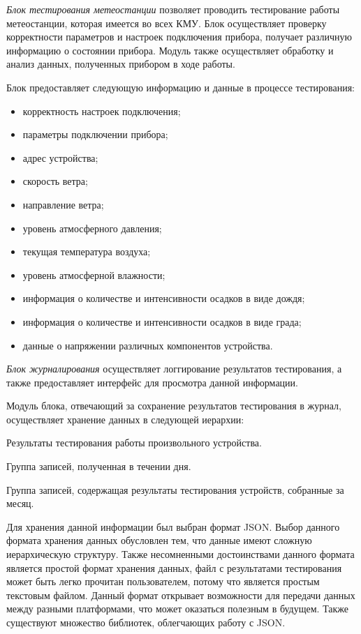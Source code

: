 \textit{Блок тестирования метеостанции} позволяет проводить тестирование работы метеостанции, которая имеется во
всех КМУ.
Блок осуществляет проверку корректности параметров и настроек подключения прибора, получает различную
информацию о
состоянии прибора. Модуль также осуществляет обработку и анализ данных, полученных прибором в ходе работы.

Блок предоставляет следующую информацию и данные в процессе тестирования:
\begin{itemize}
		\item корректность настроек подключения;
		\item параметры подключении прибора;
		\item адрес устройства;
		\item скорость ветра;
		\item направление ветра;
		\item уровень атмосферного давления;
		\item текущая температура воздуха;
		\item уровень атмосферной влажности;
		\item информация о количестве и интенсивности осадков в виде дождя;
		\item информация о количестве и интенсивности осадков в виде града;
		\item данные о напряжении различных компонентов устройства.
\end{itemize}

\textit{Блок журналирования} осуществляет логгирование результатов тестирования, а также предоставляет интерфейс для
просмотра данной информации.

Модуль блока, отвечающий за сохранение результатов тестирования в журнал, осуществляет хранение данных в следующей
иерархии:
\begin{enum}
	\item Результаты тестирования работы произвольного устройства.
	\item Группа записей, полученная в течении дня.
	\item Группа записей, содержащая результаты тестирования устройств, собранные за месяц.
\end{enum}

Для хранения данной информации был выбран формат JSON. Выбор данного формата хранения данных обусловлен тем, что данные
имеют сложную иерархическую структуру. Также несомненными достоинствами данного формата является простой формат
хранения данных, файл с результатами тестирования может быть легко прочитан пользователем, потому что является простым
текстовым файлом. Данный формат открывает возможности для передачи данных между разными платформами, что может оказаться
полезным в будущем. Также существуют множество библиотек, облегчающих работу с JSON.

